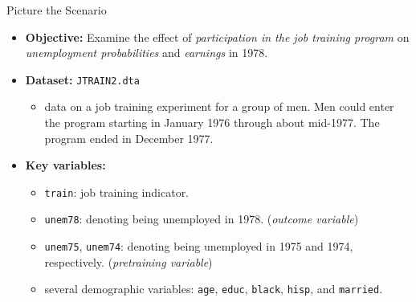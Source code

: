 \documentclass[
  10pt,
  ignorenonframetext,
]{beamer}
\providecommand{\tightlist}{%
  \setlength{\itemsep}{0pt}\setlength{\parskip}{0pt}}
\begin{document}
\begin{frame}[fragile]{Picture the Scenario}
\protect\hypertarget{picture-the-scenario}{}
\begin{itemize}
\tightlist
\item
  \textbf{Objective:} Examine the effect of \emph{participation in the
  job training program} on \emph{unemployment probabilities} and
  \emph{earnings} in 1978.
\end{itemize}

\vspace{0.8mm}

\begin{itemize}
\tightlist
\item
  \textbf{Dataset:} \texttt{JTRAIN2.dta}

  \begin{itemize}
  \tightlist
  \item
    data on a job training experiment for a group of men. Men could
    enter the program starting in January 1976 through about mid-1977.
    The program ended in December 1977.
  \end{itemize}
\end{itemize}

\vspace{0.8mm}

\begin{itemize}
\tightlist
\item
  \textbf{Key variables:}

  \begin{itemize}
  \tightlist
  \item
    \texttt{train}: job training indicator.
  \item
    \texttt{unem78}: denoting being unemployed in 1978. (\emph{outcome
    variable})
  \item
    \texttt{unem75}, \texttt{unem74}: denoting being unemployed in 1975
    and 1974, respectively. (\emph{pretraining variable})
  \item
    several demographic variables: \texttt{age}, \texttt{educ},
    \texttt{black}, \texttt{hisp}, and \texttt{married}.
  \end{itemize}
\end{itemize}
\end{frame}
\end{document}
